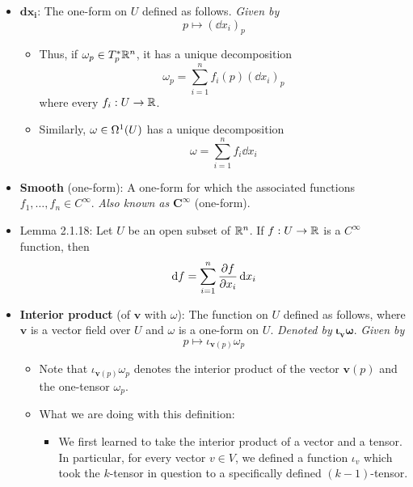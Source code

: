 \documentclass[../notes.tex]{subfiles}
\begin{document}
\begin{itemize}
    \item $\bm{\mathbf{d}x_i}$: The one-form on $U$ defined as follows. \emph{Given by}
    \begin{equation*}
        p \mapsto (\dd x_i)_p
    \end{equation*}
    \begin{itemize}
        \item Thus, if $\omega_p\in T_p^*\R^n$, it has a unique decomposition
        \begin{equation*}
            \omega_p = \sum_{i=1}^nf_i(p)(\dd x_i)_p
        \end{equation*}
        where every $f_i:U\to\R$.
        \item Similarly, $\omega\in\ome[1]{U}$ has a unique decomposition
        \begin{equation*}
            \omega = \sum_{i=1}^nf_i\dd x_i
        \end{equation*}
    \end{itemize}
    \item \textbf{Smooth} (one-form): A one-form for which the associated functions $f_1,\dots,f_n\in C^\infty$. \emph{Also known as} $\bm{C^\infty}$ (one-form).
    \item Lemma 2.1.18: Let $U$ be an open subset of $\R^n$. If $f:U\to\R$ is a $C^\infty$ function, then
    \begin{equation*}
        \dd f = \sum_{i=1}^n\pdv{f}{x_i}\dd{x_i}
    \end{equation*}
    \item \textbf{Interior product} (of $\bm{v}$ with $\omega$): The function on $U$ defined as follows, where $\bm{v}$ is a vector field over $U$ and $\omega$ is a one-form on $U$. \emph{Denoted by} $\bm{\iota_{\pmb{v}}\omega}$. \emph{Given by}
    \begin{equation*}
        p \mapsto \iota_{\bm{v}(p)}\omega_p
    \end{equation*}
    \begin{itemize}
        \item Note that $\iota_{\bm{v}(p)}\omega_p$ denotes the interior product of the vector $\bm{v}(p)$ and the one-tensor $\omega_p$.
        \item What we are doing with this definition:
        \begin{itemize}
            \item We first learned to take the interior product of a vector and a tensor. In particular, for every vector $v\in V$, we defined a function $\iota_v$ which took the $k$-tensor in question to a specifically defined $(k-1)$-tensor.

\end{itemize}
\end{itemize}
\end{itemize}
\end{document}
